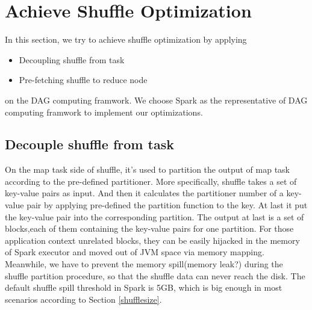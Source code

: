 \section{Achieve Shuffle Optimization}
In this section, we try to achieve shuffle optimization by applying
\begin{itemize}
	\item Decoupling shuffle from task
	\item Pre-fetching shuffle to reduce node
\end{itemize}
on the DAG computing framwork.
We choose Spark as the representative of DAG computing framwork to implement our optimizations.
\subsection{Decouple shuffle from task}
On the map task side of shuffle, it's used to partition the output of map task according to the pre-defined partitioner. More specifically, shuffle takes a set of key-value pairs as input. And then it calculates the partitioner number of a key-value pair by applying pre-defined the partition function to the key. At last it put the key-value pair into the corresponding partition. The output at last is a set of blocks,each of them containing the key-value pairs for one partition. For those application context unrelated blocks, they can be easily hijacked in the memory of Spark executor and moved out of JVM space via memory mapping. Meanwhile, we have to prevent the memory spill(memory leak?) during the shuffle partition procedure, so that the shuffle data can never reach the disk. The default shuffle spill threshold in Spark is 5GB\cite{sparksource}, which is big enough in most scenarios according to Section \ref{shufflesize}.

